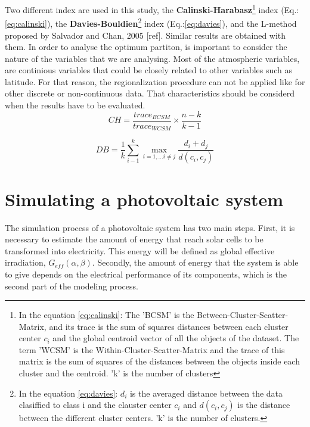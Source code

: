 Two different index are used in this study, the \textbf{Calinski-Harabasz}\footnote{In the equation \ref{eq:calinski}: The 'BCSM' is the Between-Cluster-Scatter-Matrix, and its trace is the sum of squares distances between each cluster center $c_{i}$ and the global centroid vector of all the objects of the dataset. The term 'WCSM' is the Within-Cluster-Scatter-Matrix and the trace of this matrix is the sum of squares of the distances between the objects inside each cluster and the centroid. 'k' is the number of clusters} index (Eq.:\ref{eq:calinski}), the \textbf{Davies-Bouldien}\footnote{In the equation \ref{eq:davies}: $d_{i}$ is the averaged distance between the data clasiffied to class i and the clauster center $c_{i}$ and $d(c_i,c_j)$ is the distance between the different cluster centers. 'k' is the number of clusters.}  index (Eq.:\ref{eq:davies}), and the L-method proposed by Salvador and Chan, 2005 [ref]. Similar results are obtained with them. In order to analyse the optimum partiton, is important to consider the nature of the variables that we are analysing. Most of the atmospheric variables, are continious variables that could be closely related to other variables such as latitude. For that reason, the regionalization procedure can not be applied like for other discrete or non-continuous data. That characteristics should be considerd when the results have to be evaluated.\\

\begin{equation}\label{eq:calinski}
    CH =\frac{trace_{BCSM}}{trace_{WCSM}}\times\frac{n-k}{k-1}
\end{equation}

\begin{equation}\label{eq:davies}
    DB =\frac{1}{k}\sum_{i-1}^{k}\max_{i=1,...i\neq{j}}{\frac{d_{i}+d_{j}}{d(c_i,c_j)}}
\end{equation}

\section{Simulating a photovoltaic system}

The simulation process of a photovoltaic system has two main steps. First, it is necessary to estimate the amount of energy that reach solar cells to be transformed into electricity. This energy will be defined as global effective irradiation, $G_{eff}(\alpha, \beta)$. Secondly, the amount of energy that the system is able to give depends on the electrical performance of its components, which is the second part of the modeling process.\\

